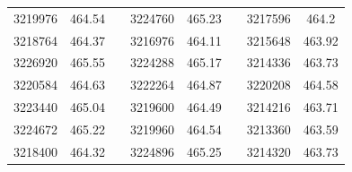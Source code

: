 \documentclass[12pt]{mwart}
\begin{document}
\begin{table}[H]
\begin{tabular}{cclcclcc}
		3219976                                                  & 464.54                                                        &  & 3224760                                                  & 465.23                                                        &  & 3217596                                                  & 464.2                                                         \\
		3218764                                                  & 464.37                                                        &  & 3216976                                                  & 464.11                                                        &  & 3215648                                                  & 463.92                                                        \\
		3226920                                                  & 465.55                                                        &  & 3224288                                                  & 465.17                                                        &  & 3214336                                                  & 463.73                                                        \\
		3220584                                                  & 464.63                                                        &  & 3222264                                                  & 464.87                                                        &  & 3220208                                                  & 464.58                                                        \\
		3223440                                                  & 465.04                                                        &  & 3219600                                                  & 464.49                                                        &  & 3214216                                                  & 463.71                                                        \\
		3224672                                                  & 465.22                                                        &  & 3219960                                                  & 464.54                                                        &  & 3213360                                                  & 463.59                                                        \\
		3218400                                                  & 464.32                                                        &  & 3224896                                                  & 465.25                                                        &  & 3214320                                                  & 463.73                                                        \\

\end{tabular}
\end{table}
\end{document}
